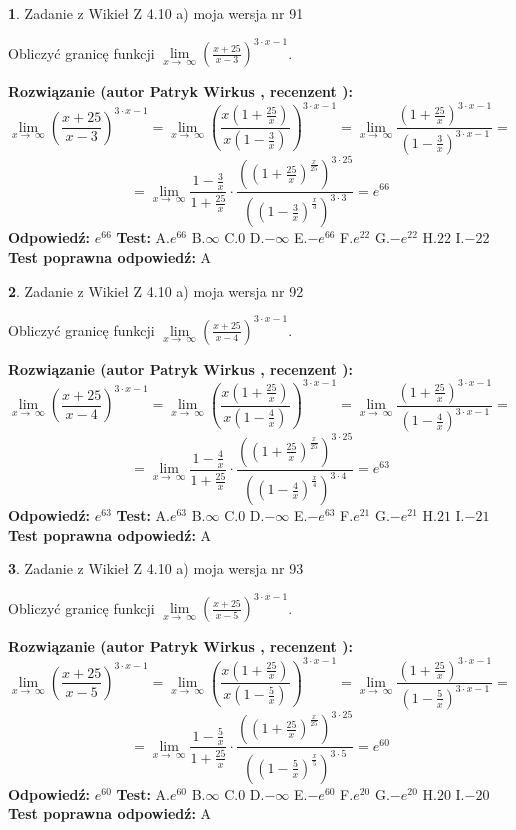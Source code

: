 \documentclass[12pt, a4paper]{article}
\theoremstyle{definition} %
\newtheorem{zad}{}
\newcommand{\zadStart}[1]{\begin{zad}#1\newline}
\newcommand{\zadStop}{\end{zad}}
\newcommand{\rozwStart}[2]{\noindent \textbf{Rozwiązanie (autor #1 , recenzent #2): }\newline}
\newcommand{\rozwStop}{\newline}
\newcommand{\odpStart}{\noindent \textbf{Odpowiedź:}\newline}
\newcommand{\odpStop}{\newline}
\newcommand{\testStart}{\noindent \textbf{Test:}\newline}
\newcommand{\testStop}{\newline}
\newcommand{\kluczStart}{\noindent \textbf{Test poprawna odpowiedź:}\newline}
\newcommand{\kluczStop}{\newline}
\begin{document}
\zadStart{Zadanie z Wikieł Z 4.10 a) moja wersja nr 91}

Obliczyć granicę funkcji  $\lim\limits_{x\to\ \infty}(\frac{x+25}{x-3})^{3\cdot x-1}$.
\zadStop
\rozwStart{Patryk Wirkus}{}
$$\lim\limits_{x\to\ \infty}(\frac{x+25}{x-3})^{3\cdot x-1} = \lim\limits_{x\to\ \infty}(\frac{x(1+\frac{25}{x})}{x(1-\frac{3}{x})})^{3\cdot x-1}=\lim\limits_{x\to\ \infty}\frac{(1+\frac{25}{x})^{3\cdot x-1}}{(1-\frac{3}{x})^{3\cdot x-1}}=$$
$$=\lim\limits_{x\to\ \infty}\frac{1-\frac{3}{x}}{1+\frac{25}{x}}\cdot\frac{((1+\frac{25}{x})^{\frac{x}{25}})^{3\cdot25}}{((1-\frac{3}{x})^{\frac{x}{3}})^{3\cdot3}}=e^{66}$$
\rozwStop
\odpStart
$e^{66}$
\odpStop
\testStart
A.$e^{66}$ B.$\infty$ C.$0$ D.$-\infty$ E.$-e^{66}$
F.$e^{22}$ G.$-e^{22}$
H.$22$
I.$-22$
\testStop
\kluczStart
A
\kluczStop



\zadStart{Zadanie z Wikieł Z 4.10 a) moja wersja nr 92}

Obliczyć granicę funkcji  $\lim\limits_{x\to\ \infty}(\frac{x+25}{x-4})^{3\cdot x-1}$.
\zadStop
\rozwStart{Patryk Wirkus}{}
$$\lim\limits_{x\to\ \infty}(\frac{x+25}{x-4})^{3\cdot x-1} = \lim\limits_{x\to\ \infty}(\frac{x(1+\frac{25}{x})}{x(1-\frac{4}{x})})^{3\cdot x-1}=\lim\limits_{x\to\ \infty}\frac{(1+\frac{25}{x})^{3\cdot x-1}}{(1-\frac{4}{x})^{3\cdot x-1}}=$$
$$=\lim\limits_{x\to\ \infty}\frac{1-\frac{4}{x}}{1+\frac{25}{x}}\cdot\frac{((1+\frac{25}{x})^{\frac{x}{25}})^{3\cdot25}}{((1-\frac{4}{x})^{\frac{x}{4}})^{3\cdot4}}=e^{63}$$
\rozwStop
\odpStart
$e^{63}$
\odpStop
\testStart
A.$e^{63}$ B.$\infty$ C.$0$ D.$-\infty$ E.$-e^{63}$
F.$e^{21}$ G.$-e^{21}$
H.$21$
I.$-21$
\testStop
\kluczStart
A
\kluczStop



\zadStart{Zadanie z Wikieł Z 4.10 a) moja wersja nr 93}

Obliczyć granicę funkcji  $\lim\limits_{x\to\ \infty}(\frac{x+25}{x-5})^{3\cdot x-1}$.
\zadStop
\rozwStart{Patryk Wirkus}{}
$$\lim\limits_{x\to\ \infty}(\frac{x+25}{x-5})^{3\cdot x-1} = \lim\limits_{x\to\ \infty}(\frac{x(1+\frac{25}{x})}{x(1-\frac{5}{x})})^{3\cdot x-1}=\lim\limits_{x\to\ \infty}\frac{(1+\frac{25}{x})^{3\cdot x-1}}{(1-\frac{5}{x})^{3\cdot x-1}}=$$
$$=\lim\limits_{x\to\ \infty}\frac{1-\frac{5}{x}}{1+\frac{25}{x}}\cdot\frac{((1+\frac{25}{x})^{\frac{x}{25}})^{3\cdot25}}{((1-\frac{5}{x})^{\frac{x}{5}})^{3\cdot5}}=e^{60}$$
\rozwStop
\odpStart
$e^{60}$
\odpStop
\testStart
A.$e^{60}$ B.$\infty$ C.$0$ D.$-\infty$ E.$-e^{60}$
F.$e^{20}$ G.$-e^{20}$
H.$20$
I.$-20$
\testStop
\kluczStart
A
\kluczStop
\end{document}
